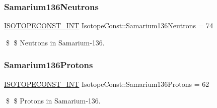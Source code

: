 \subsubsection{\texorpdfstring{Samarium136\+Neutrons}{Samarium136Neutrons}}
{\footnotesize\ttfamily \mbox{\hyperlink{group___isotope_const-_macros_ga5f18360b3e99483a35c32d789e62621c}{I\+S\+O\+T\+O\+P\+E\+C\+O\+N\+S\+T\+\_\+\+I\+NT}} Isotope\+Const\+::\+Samarium136\+Neutrons = 74}

\$ \$ Neutrons in Samarium-\/136. \mbox{\label{group___isotope_const-_samarium-_sm136_ga51cfc5cdf39c89d69abea759df050281}} 
\subsubsection{\texorpdfstring{Samarium136\+Protons}{Samarium136Protons}}
{\footnotesize\ttfamily \mbox{\hyperlink{group___isotope_const-_macros_ga5f18360b3e99483a35c32d789e62621c}{I\+S\+O\+T\+O\+P\+E\+C\+O\+N\+S\+T\+\_\+\+I\+NT}} Isotope\+Const\+::\+Samarium136\+Protons = 62}

\$ \$ Protons in Samarium-\/136. 